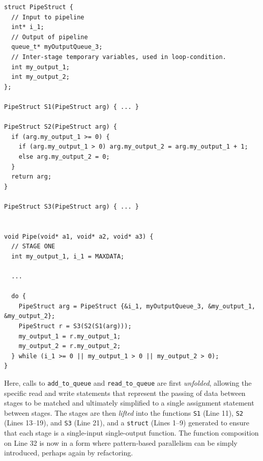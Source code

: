 \begin{lstlisting}[caption=Clean Sequential Simple Pipeline Code, frame=single, label=lst:pipeClean]
struct PipeStruct {
  // Input to pipeline
  int* i_1;
  // Output of pipeline
  queue_t* myOutputQueue_3;
  // Inter-stage temporary variables, used in loop-condition.
  int my_output_1;
  int my_output_2;
};

PipeStruct S1(PipeStruct arg) { ... }

PipeStruct S2(PipeStruct arg) {
  if (arg.my_output_1 >= 0) {
    if (arg.my_output_1 > 0) arg.my_output_2 = arg.my_output_1 + 1;
    else arg.my_output_2 = 0;
  }
  return arg;
}

PipeStruct S3(PipeStruct arg) { ... }


void Pipe(void* a1, void* a2, void* a3) {
  // STAGE ONE
  int my_output_1, i_1 = MAXDATA;
  
  ...

  do {
    PipeStruct arg = PipeStruct {&i_1, myOutputQueue_3, &my_output_1, &my_output_2};
    PipeStruct r = S3(S2(S1(arg)));
    my_output_1 = r.my_output_1;
    my_output_2 = r.my_output_2;
  } while (i_1 >= 0 || my_output_1 > 0 || my_output_2 > 0);
}
\end{lstlisting}

\noindent
Here, calls to \lstinline|add_to_queue| and \lstinline|read_to_queue| are first \emph{unfolded}, allowing the specific read and write statements that represent the passing of data between stages to be matched and ultimately simplified to a single assignment statement between stages. The stages are then \emph{lifted} into the functions \lstinline|S1| (Line 11), \lstinline|S2| (Lines 13--19), and \lstinline|S3| (Line 21), and a \lstinline|struct| (Lines 1--9) generated to ensure that each stage is a single-input single-output function. The function composition on Line 32 is now in a form where pattern-based parallelism can be simply introduced, perhaps again by refactoring.



